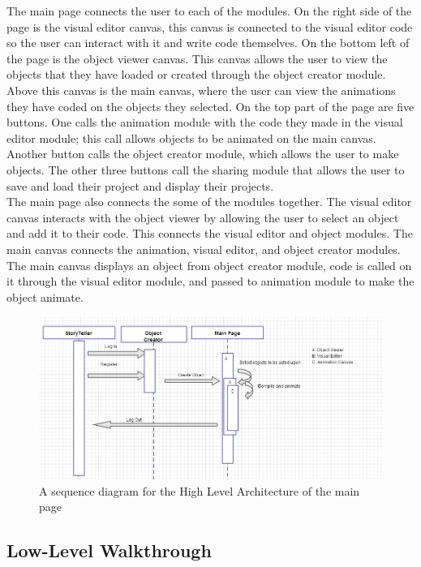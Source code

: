 \documentclass[12pt]{article}
\begin{document}
The main page connects the user to each of the modules. On the right side of the page is the visual editor canvas, this canvas is connected to the visual editor code so the user can interact with it and write code themselves. On the bottom left of the page is the object viewer canvas. This canvas allows the user to view the objects that they have loaded or created through the object creator module. Above this canvas is the main canvas, where the user can view the animations they have coded on the objects they selected. On the top part of the page are five buttons. One calls the animation module with the code they made in the visual editor module; this call allows objects to be animated on the main canvas. Another button calls the object creator module, which allows the user to make objects. The other three buttons call the sharing module that allows the user to save and load their project and display their projects. \\

The main page also connects the some of the modules together. The visual editor canvas interacts with the object viewer by allowing the user to select an object and add it to their code. This connects the visual editor and object modules. The main canvas connects the animation, visual editor, and object creator modules. The main canvas displays an object from object creator module, code is called on it through the visual editor module, and passed to animation module to make the object animate. 

\begin{figure}
    \includegraphics[scale=0.5]{HighLevelArchitechtureUML.png}
    \caption{A sequence diagram for the High Level Architecture of the main page}
    \label{Figure 1}
\end{figure}


\subsection{Low-Level Walkthrough}
\end{document}
